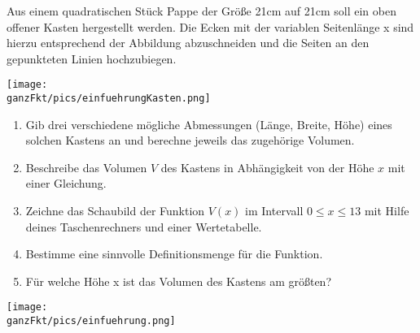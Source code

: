 \begin{minipage}{0.66\textwidth}
	Aus einem quadratischen Stück Pappe der Größe  21cm auf 21cm soll ein oben offener Kasten hergestellt werden. Die Ecken mit der variablen Seitenlänge x sind hierzu entsprechend der Abbildung abzuschneiden und die Seiten an den gepunkteten Linien hochzubiegen.
\end{minipage}
\begin{minipage}{0.32\textwidth}
	\texttt{[image: \\ganzFkt/pics/einfuehrungKasten.png]}
\end{minipage}
\vspace{0.5cm}

\begin{enumerate}[label=\alph*)]
	\item Gib drei verschiedene mögliche Abmessungen (Länge, Breite, Höhe) eines solchen Kastens an und berechne jeweils das zugehörige Volumen.
	\item Beschreibe das Volumen \(V\) des Kastens in Abhängigkeit von der Höhe \(x\) mit einer Gleichung.
	\item Zeichne das Schaubild der Funktion \(V(x)\) im Intervall \(0 \leq x \leq 13\) mit Hilfe deines Taschenrechners und einer Wertetabelle.
	\item Bestimme eine sinnvolle Definitionsmenge für die Funktion.
	\item Für welche Höhe x ist das Volumen des Kastens am größten?
\end{enumerate}
\vspace{0.5cm}
\texttt{[image: \\ganzFkt/pics/einfuehrung.png]}
\newpage
